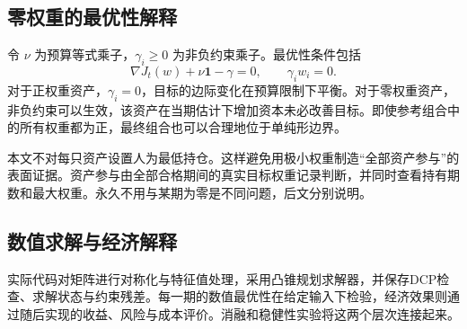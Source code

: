 \subsection{零权重的最优性解释}

令 $\nu$ 为预算等式乘子，$\gamma_i\geq0$ 为非负约束乘子。最优性条件包括
\[
\nabla J_t(w)+\nu\mathbf1-\gamma=0,\qquad
\gamma_iw_i=0.
\]
对于正权重资产，$\gamma_i=0$，目标的边际变化在预算限制下平衡。对于零权重资产，非负约束可以生效，该资产在当期估计下增加资本未必改善目标。即使参考组合中的所有权重都为正，最终组合也可以合理地位于单纯形边界。

本文不对每只资产设置人为最低持仓。这样避免用极小权重制造“全部资产参与”的表面证据。资产参与由全部合格期间的真实目标权重记录判断，并同时查看持有期数和最大权重。永久不用与某期为零是不同问题，后文分别说明。

\subsection{数值求解与经济解释}
实际代码对矩阵进行对称化与特征值处理，采用凸锥规划求解器，并保存DCP检查、求解状态与约束残差。每一期的数值最优性在给定输入下检验，经济效果则通过随后实现的收益、风险与成本评价。消融和稳健性实验将这两个层次连接起来。
